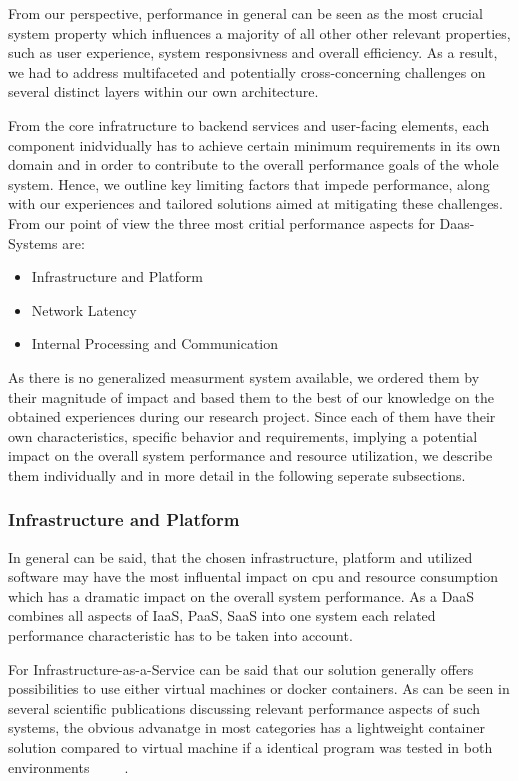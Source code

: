 \documentclass[runningheads]{llncs}
\begin{document}
From our perspective, performance in general can be seen as the most crucial system property
which influences a majority of all other other relevant properties,
such as user experience, system responsivness and overall efficiency.
As a result, we had to address multifaceted
and potentially cross-concerning challenges
on several distinct layers within our own architecture.

From the core infratructure to backend services
and user-facing elements, each component inidvidually
has to achieve certain minimum requirements in its own domain
and in order to contribute to the overall performance goals of the whole system.
Hence, we outline key limiting factors that impede performance,
along with our experiences and tailored solutions
aimed at mitigating these challenges.
From our point of view the three most critial performance aspects
for Daas-Systems are:
\begin{itemize}
	\item Infrastructure and Platform
	\item Network Latency
	\item Internal Processing and Communication
\end{itemize}
As there is no generalized measurment system available,
we ordered them by their magnitude of impact
and based them to the best of our knowledge
on the obtained experiences during our research project.
Since each of them have their own characteristics,
specific behavior and requirements, implying a potential impact
on the overall system performance and resource utilization,
we describe them individually and in more detail
in the following seperate subsections.

\subsubsection{Infrastructure and Platform}
In general can be said, that the chosen infrastructure, platform and utilized software
may have the most influental impact on cpu and resource consumption
which has a dramatic impact on the overall system performance.
As a DaaS combines all aspects of IaaS, PaaS, SaaS into one system
each related performance characteristic has to be taken into account.

For Infrastructure-as-a-Service can be said
that our solution generally offers possibilities
to use either virtual machines or docker containers.
As can be seen in several scientific publications
discussing relevant performance aspects of such systems,
the obvious advanatge in most categories
has a lightweight container solution compared to virtual machine
if a identical program was tested in both environments
~\cite{felter2015updated}
~\cite{potdar2020performance}
~\cite{seo2014performance}.
\end{document}
